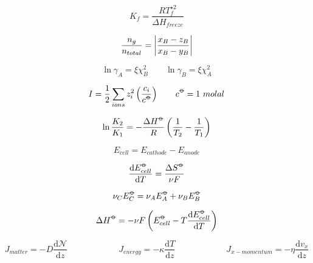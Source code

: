 \documentclass[12pt, letterpaper]{memoir}
\begin{document}
\begin{minipage}[t]{0.5\linewidth}
	\begin{equation*}
		K_f=\frac{RT^{\star 2}_f}{\Delta H_{freeze}}
	\end{equation*}	

	\begin{equation*}
		\frac{n_g}{n_{total}}=\left| \frac{x_B-z_B}{x_B-y_B} \right|
	\end{equation*}
	
	\begin{equation*}
		\ln\gamma_A=\xi\chi_B^2 \hspace{2em} \ln\gamma_B=\xi\chi_A^2
	\end{equation*}
	
	\begin{equation*}
		I = \frac{1}{2}\sum\limits_{ions}z_i^2\left(\frac{c_i}{c^{\std}}\right) \hspace{2em} c^{\std}=1~molal
	\end{equation*}

	\begin{equation*}
		\ln\frac{K_2}{K_1} = -\frac{\Delta H^{\std}}{R}\left(\frac{1}{T_2}-\frac{1}{T_1}\right)
	\end{equation*}
	
	\begin{equation*}
		E_{cell}=E_{cathode}-E_{anode}
	\end{equation*}
	
	\begin{equation*}
		\frac{\mathrm{d}E^{\std}_{cell}}{\mathrm{d}T}=\frac{\Delta S^{\std}}{\nu F}
	\end{equation*}
	
	\begin{equation*}
		\nu_CE^{\std}_C = \nu_AE^{\std}_A + \nu_BE^{\std}_B
	\end{equation*}
	
	\begin{equation*}
		\Delta H^{\std}=-\nu F\left(E^{\std}_{cell}-T\frac{\mathrm{d}E^{\std}_{cell}}{\mathrm{d}T}\right)
	\end{equation*}	
\end{minipage}

\begin{equation*}
	J_{matter}=-D\frac{\mathrm{d}\mathcal{N}}{\mathrm{d}z} \hspace{6em} J_{energy}=-\kappa\frac{\mathrm{d}T}{\mathrm{d}z} \hspace{6em} J_{x-momentum}=-\eta\frac{\mathrm{d}v_x}{\mathrm{d}z}
\end{equation*}
\end{document}
